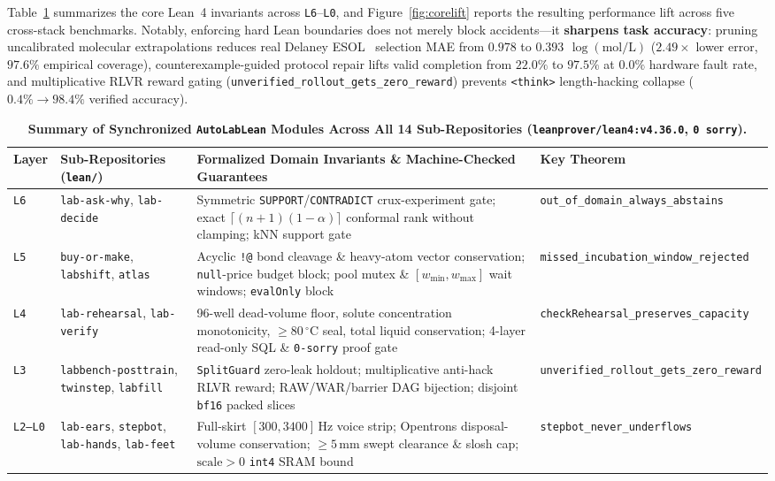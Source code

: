 \documentclass[10pt,letterpaper]{article}
\begin{document}
Table~\ref{tab:layers} summarizes the core Lean~4 invariants across \texttt{L6}--\texttt{L0}, and Figure~\ref{fig:corelift} reports the resulting performance lift across five cross-stack benchmarks. Notably, enforcing hard Lean boundaries does not merely block accidents—it \textbf{sharpens task accuracy}: pruning uncalibrated molecular extrapolations reduces real Delaney ESOL~\cite{delaney2004esol} selection MAE from $0.978$ to \textbf{$0.393$ $\log(\text{mol/L})$} ($2.49\times$ lower error, $97.6\%$ empirical coverage), counterexample-guided protocol repair lifts valid completion from $22.0\%$ to \textbf{$97.5\%$} at $0.0\%$ hardware fault rate, and multiplicative RLVR reward gating (\texttt{unverified\_rollout\_gets\_zero\_reward}) prevents \texttt{<think>} length-hacking collapse ($0.4\% \to \mathbf{98.4\%}$ verified accuracy).

\begin{table}[t!]
  \centering
  \small
  \caption{\textbf{Summary of Synchronized \texttt{AutoLabLean} Modules Across All 14 Sub-Repositories (\texttt{leanprover/lean4:v4.36.0}, \texttt{0 sorry}).}}
  \label{tab:layers}
  \begin{tabularx}{\textwidth}{@{}llXl@{}}
    \toprule
    \textbf{Layer} & \textbf{Sub-Repositories (\texttt{lean/})} & \textbf{Formalized Domain Invariants \& Machine-Checked Guarantees} & \textbf{Key Theorem} \\
    \midrule
    \texttt{L6} & \texttt{lab-ask-why}, \texttt{lab-decide} & Symmetric \texttt{SUPPORT}/\texttt{CONTRADICT} crux-experiment gate; exact $\lceil(n+1)(1-\alpha)\rceil$ conformal rank without clamping; kNN support gate & \texttt{out\_of\_domain\_always\_abstains} \\
    \texttt{L5} & \texttt{buy-or-make}, \texttt{labshift}, \texttt{atlas} & Acyclic \texttt{!@} bond cleavage \& heavy-atom vector conservation; \texttt{null}-price budget block; pool mutex \& $[w_{\min},w_{\max}]$ wait windows; \texttt{evalOnly} block & \texttt{missed\_incubation\_window\_rejected} \\
    \texttt{L4} & \texttt{lab-rehearsal}, \texttt{lab-verify} & 96-well dead-volume floor, solute concentration monotonicity, $\ge 80\,^\circ\text{C}$ seal, total liquid conservation; 4-layer read-only SQL \& \texttt{0-sorry} proof gate & \texttt{checkRehearsal\_preserves\_capacity} \\
    \texttt{L3} & \texttt{labbench-posttrain}, \texttt{twinstep}, \texttt{labfill} & \texttt{SplitGuard} zero-leak holdout; multiplicative anti-hack RLVR reward; RAW/WAR/barrier DAG bijection; disjoint \texttt{bf16} packed slices & \texttt{unverified\_rollout\_gets\_zero\_reward} \\
    \texttt{L2--L0} & \texttt{lab-ears}, \texttt{stepbot}, \texttt{lab-hands}, \texttt{lab-feet} & Full-skirt $[300,3400]\,\text{Hz}$ voice strip; Opentrons disposal-volume conservation; $\ge 5\,\text{mm}$ swept clearance \& slosh cap; $\text{scale}>0$ \texttt{int4} SRAM bound & \texttt{stepbot\_never\_underflows} \\
    \bottomrule
  \end{tabularx}
\end{table}
\end{document}
